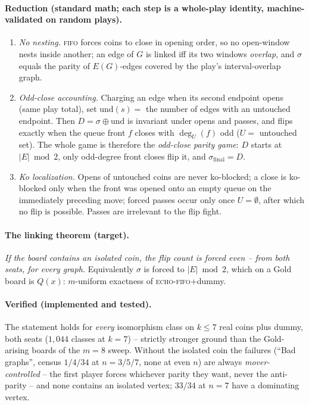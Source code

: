 \documentclass[11pt]{article}
\theoremstyle{plain}
\theoremstyle{definition}
\begin{document}
\paragraph{Reduction (standard math; each step is a whole-play identity,
machine-validated on random plays).}
\begin{enumerate}[leftmargin=*,itemsep=0pt]
\item \emph{No nesting.} \textsc{fifo} forces coins to close in opening
order, so no open-window nests inside another; an edge of $G$ is linked
iff its two windows \emph{overlap}, and $\sigma$ equals the parity of
$E(G)$-edges covered by the play's interval-overlap graph.
\item \emph{Odd-close accounting.} Charging an edge when its second
endpoint opens (same play total), set $\mathrm{und}(s)=$ the number of
edges with an untouched endpoint. Then $D=\sigma\oplus\mathrm{und}$ is
invariant under opens and passes, and flips exactly when the queue front
$f$ closes with $\deg_U(f)$ odd ($U=$ untouched set). The whole game is
therefore the \emph{odd-close parity game}: $D$ starts at $|E|\bmod 2$,
only odd-degree front closes flip it, and $\sigma_{\mathrm{final}}=D$.
\item \emph{Ko localization.} Opens of untouched coins are never
ko-blocked; a close is ko-blocked only when the front was opened onto an
empty queue on the immediately preceding move; forced passes occur only
once $U=\emptyset$, after which no flip is possible. Passes are
irrelevant to the flip fight.
\end{enumerate}

\paragraph{The linking theorem (target).} \emph{If the board contains an
isolated coin, the flip count is forced even -- from both seats, for
every graph.} Equivalently $\sigma$ is forced to $|E|\bmod 2$, which on a
Gold board is $Q(x)$: $m$-uniform exactness of \textsc{echo}-\textsc{fifo}+dummy.

\paragraph{Verified (implemented and tested).} The statement holds for
\emph{every} isomorphism class on $k\leq 7$ real coins plus dummy, both
seats ($1{,}044$ classes at $k=7$) -- strictly stronger ground than the
Gold-arising boards of the $m=8$ sweep. Without the isolated coin the
failures (``Bad graphs'', census $1/4/34$ at $n=3/5/7$, none at even $n$)
are always \emph{mover-controlled} -- the first player forces whichever
parity they want, never the anti-parity -- and none contains an isolated
vertex; $33/34$ at $n=7$ have a dominating vertex.
\end{document}
